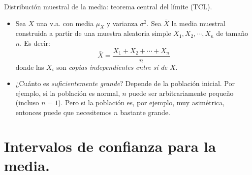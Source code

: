 \documentclass[
  9pt,
  ignorenonframetext,
]{beamer}
\providecommand{\tightlist}{%
  \setlength{\itemsep}{0pt}\setlength{\parskip}{0pt}}
\begin{document}
\begin{frame}{Distribución muestral de la media: teorema central del
límite (TCL).}
\protect\hypertarget{distribucion-muestral-de-la-media-teorema-central-del-limite-tcl.}{}

\begin{itemize}
\tightlist
\item
  Sea \(X\) una v.a. con media \(\mu_X\) y varianza \(\sigma^2\). Sea
  \(\bar X\) la media muestral construida a partir de una muestra
  aleatoria simple \(X_1, X_2,\cdots, X_n\) de tamaño \(n\). Es decir:
  \[\bar X = \dfrac{X_1+X_2+\cdots +X_n}{n}\] donde las \(X_i\) son
  \emph{copias independientes entre sí de \(X\)}.
\end{itemize}

\begin{center}
\end{center}

\begin{itemize}
\tightlist
\item
  ¿Cuánto es \emph{suficientemente grande}? Depende de la población
  inicial. Por ejemplo, si la población es normal, \(n\) puede ser
  arbitrariamente pequeño (incluso \(n = 1\)). Pero si la población es,
  por ejemplo, muy asimétrica, entonces puede que necesitemos \(n\)
  bastante grande.
\end{itemize}

\end{frame}

\hypertarget{intervalos-de-confianza-para-la-media.}{%
\section{Intervalos de confianza para la
media.}\label{intervalos-de-confianza-para-la-media.}}
\end{document}
